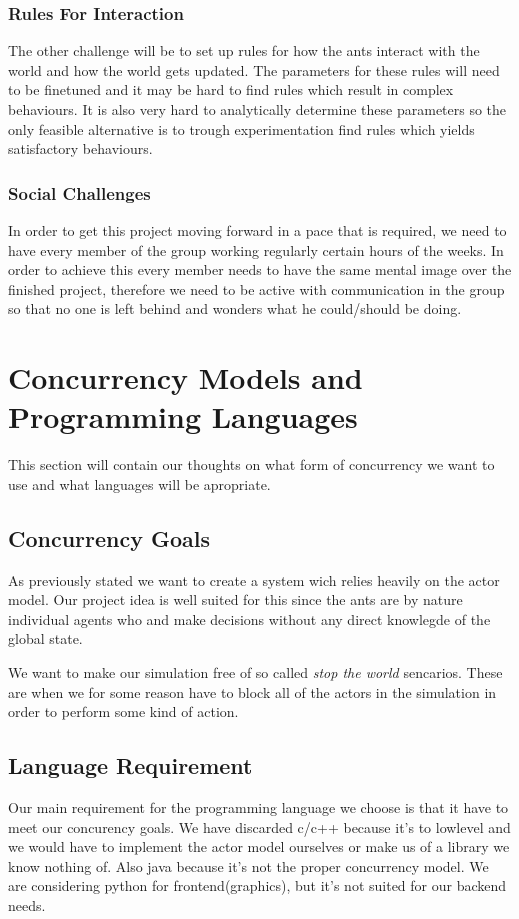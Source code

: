 \documentclass[a4paper]{article}
\begin{document}
\subsubsection{Rules For Interaction}
The other challenge will be to set up rules for how the ants interact with the
world and how the world gets updated. The parameters for these rules will need
to be finetuned and it may be hard to find rules which result in complex
behaviours. It is also very hard to analytically determine these parameters so
the only feasible alternative is to trough experimentation find rules which
yields satisfactory behaviours.

\subsubsection{Social Challenges}
In order to get this project moving forward in a pace that is required, we need
to have every member of the group working regularly certain hours of the weeks.
In order to achieve this every member needs to have the same mental image over
the finished project, therefore we need to be active with communication in the
group so that no one is left behind and wonders what he could/should be doing.

\section{Concurrency Models and Programming Languages}
This section will contain our thoughts on what form of concurrency we want to
use and what languages will be apropriate.
\subsection{Concurrency Goals}
As previously stated we want to create a system wich relies heavily on the actor
model. Our project idea is well suited for this since the ants are by nature
individual agents who and make decisions without any direct knowlegde of the
global state.

We want to make our simulation free of so called \emph{stop the world}
sencarios. These are when we for some reason have to block all of the actors in
the simulation in order to perform some kind of action.

\subsection{Language Requirement}
Our main requirement for the programming language we choose is that it have to meet our concurency goals.
We have discarded c/c++ because it's to lowlevel and we would have to implement the actor model ourselves or make us of a library we know nothing of. 
Also java because it's not the proper concurrency model. We are considering python for frontend(graphics),
but it's not suited for our backend needs.
\end{document}
